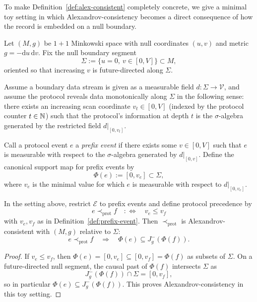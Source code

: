 To make Definition~\ref{def:alex-consistent} completely concrete, we give a minimal toy setting in which Alexandrov-consistency becomes a direct consequence of how the record is embedded on a null boundary.

Let $(M,g)$ be $1\!+\!1$ Minkowski space with null coordinates $(u,v)$ and metric $g=-\mathrm{d}u\,\mathrm{d}v$. Fix the null boundary segment
\[
\Sigma:=\{u=0,\ v\in[0,V]\}\subset M,
\]
oriented so that increasing $v$ is future-directed along $\Sigma$.

Assume a boundary data stream is given as a measurable field $d:\Sigma\to\mathcal{V}$, and assume the protocol reveals data monotonically along $\Sigma$ in the following sense: there exists an increasing scan coordinate $v_t\in[0,V]$ (indexed by the protocol counter $t\in\mathbb{N}$) such that the protocol's information at depth $t$ is the $\sigma$-algebra generated by the restricted field $d|_{[0,v_t]}$.

\begin{definition}\label{def:prefix-event}
Call a protocol event $e$ a \emph{prefix event} if there exists some $v\in[0,V]$ such that $e$ is measurable with respect to the $\sigma$-algebra generated by $d|_{[0,v]}$. Define the canonical support map for prefix events by
\[
\Phi(e):=[0,v_e]\subset \Sigma,
\]
where $v_e$ is the minimal value for which $e$ is measurable with respect to $d|_{[0,v_e]}$.
\end{definition}

\begin{proposition}\label{prop:toy-minkowski}
In the setting above, restrict $\mathcal{E}$ to prefix events and define protocol precedence by
\[
e\prec_{\mathrm{prot}} f \quad:\Longleftrightarrow\quad v_e\le v_f
\]
with $v_e,v_f$ as in Definition~\ref{def:prefix-event}. Then $\prec_{\mathrm{prot}}$ is Alexandrov-consistent with $(M,g)$ relative to $\Sigma$:
\[
e\prec_{\mathrm{prot}} f \quad\Rightarrow\quad \Phi(e)\subseteq J^-_g(\Phi(f)).
\]
\end{proposition}

\begin{proof}
If $v_e\le v_f$, then $\Phi(e)=[0,v_e]\subseteq [0,v_f]=\Phi(f)$ as subsets of $\Sigma$. On a future-directed null segment, the causal past of $\Phi(f)$ intersects $\Sigma$ as
\[
J^-_g(\Phi(f))\cap \Sigma = [0,v_f],
\]
so in particular $\Phi(e)\subseteq J^-_g(\Phi(f))$. This proves Alexandrov-consistency in this toy setting.
\end{proof}

